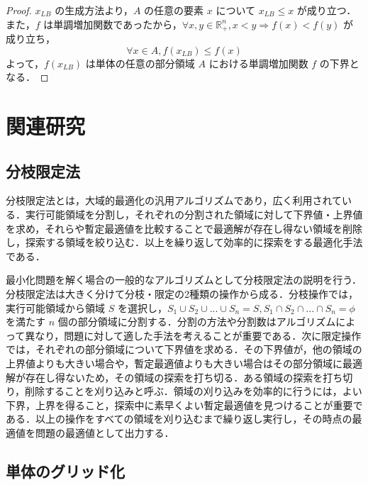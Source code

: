 \documentclass[a4paper,11pt]{jreport}
\begin{document}
\begin{proof}
$ x_{LB} $ の生成方法より，$ A $ の任意の要素 $ x $ について $ x_{LB} \leq x $ が成り立つ．\\
また，$ f $ は単調増加関数であったから，$ \forall x, y \in \mathbb{R}^n_{+}, x < y \Rightarrow f(x) < f(y) $ が成り立ち，
$$ \forall x \in A, f(x_{LB}) \leq f(x) $$
よって，$ f(x_{LB}) $ は単体の任意の部分領域 $ A $ における単調増加関数 $ f $ の下界となる．
\end{proof}

\chapter{関連研究}

\section{分枝限定法}

分枝限定法とは，大域的最適化の汎用アルゴリズムであり，広く利用されている．実行可能領域を分割し，それぞれの分割された領域に対して下界値・上界値を求め，それらや暫定最適値を比較することで最適解が存在し得ない領域を削除し，探索する領域を絞り込む．以上を繰り返して効率的に探索をする最適化手法である．\par
最小化問題を解く場合の一般的なアルゴリズムとして分枝限定法の説明を行う．分枝限定法は大きく分けて分枝・限定の2種類の操作から成る．分枝操作では，実行可能領域から領域 $ S $ を選択し，$ S_1 \cup S_2 \cup ... \cup S_n = S, S_1 \cap S_2 \cap ... \cap S_n = \phi $ を満たす $ n $ 個の部分領域に分割する．分割の方法や分割数はアルゴリズムによって異なり，問題に対して適した手法を考えることが重要である．次に限定操作では，それぞれの部分領域について下界値を求める．その下界値が，他の領域の上界値よりも大きい場合や，暫定最適値よりも大きい場合はその部分領域に最適解が存在し得ないため，その領域の探索を打ち切る．ある領域の探索を打ち切り，削除することを刈り込みと呼ぶ．領域の刈り込みを効率的に行うには，よい下界，上界を得ること，探索中に素早くよい暫定最適値を見つけることが重要である．以上の操作をすべての領域を刈り込むまで繰り返し実行し，その時点の最適値を問題の最適値として出力する．\par

\section{単体のグリッド化}
\end{document}
